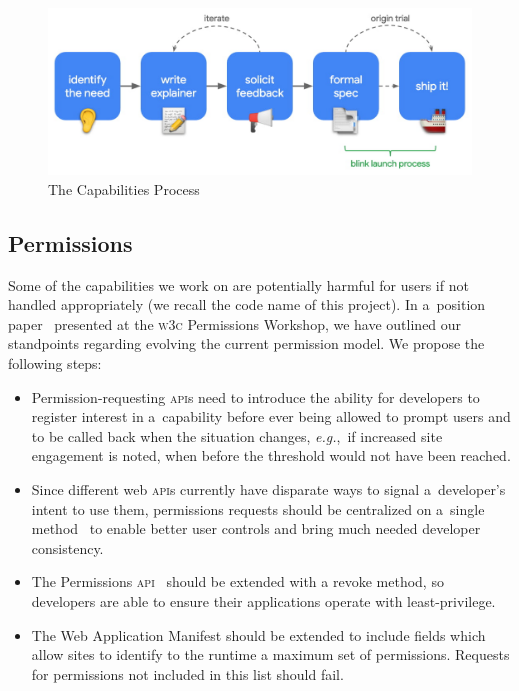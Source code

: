 \documentclass[sigconf]{acmart}
\begin{document}
\begin{figure}[hbt]
  \includegraphics[width=\columnwidth]{capabilities-process.jpg}
  \caption{The Capabilities Process}
  \label{fig:fuguprocess}
\end{figure}


\subsection{Permissions}

Some of the capabilities we work on are potentially harmful for users
if not handled appropriately (we recall the code name of this project).
In a~position paper~\cite{russell18} presented at the \textsc{w3c} Permissions Workshop,
we have outlined our standpoints regarding evolving the current permission model.
We propose the following steps:

\begin{itemize}
  \item Permission-requesting \textsc{api}s need to introduce the ability for
    developers to register interest in a~capability before ever being allowed to prompt users
    and to be called back when the situation changes, \textit{e.g.},\
    if increased site engagement is noted, when before the threshold would not have been reached.
  \item Since different web \textsc{api}s currently have disparate ways to signal
    a~developer's intent to use them, permissions requests should be centralized
    on a~single method~\cite{yasskin17} to enable
    better user controls and bring much needed developer consistency.
  \item The Permissions \textsc{api}~\cite{lamouri19} should be extended with a revoke method,
    so developers are able to ensure their applications operate with least-privilege.
  \item The Web Application Manifest should be extended to include fields
    which allow sites to identify to the runtime a maximum set of permissions.
    Requests for permissions not included in this list should fail.
\end{itemize}
\end{document}
